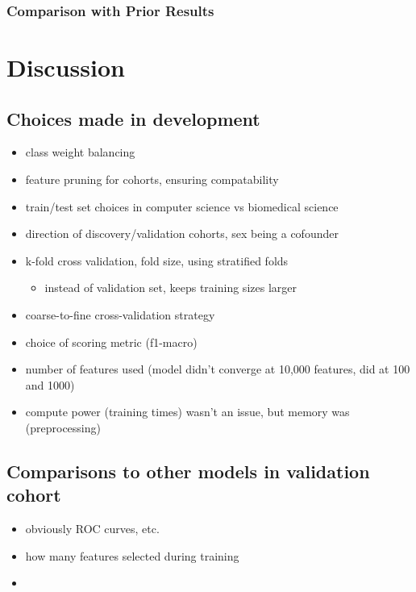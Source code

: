 \documentclass{article}
\begin{document}
\subsubsection{Comparison with Prior Results} \label{sec:model-comparison}


\section{Discussion}

\subsection*{Choices made in development}
\begin{itemize}
    \item class weight balancing
    \item feature pruning for cohorts, ensuring compatability
    \item train/test set choices in computer science vs biomedical science
    \item direction of discovery/validation cohorts, sex being a cofounder
    \item k-fold cross validation, fold size, using stratified folds
    \begin{itemize}
        \item instead of validation set, keeps training sizes larger
    \end{itemize}
    \item coarse-to-fine cross-validation strategy
    \item choice of scoring metric (f1-macro)
    \item number of features used (model didn't converge at 10,000 features, did at 100 and 1000)
    \item compute power (training times) wasn't an issue, but memory was (preprocessing)
\end{itemize}

\subsection*{Comparisons to other models in validation cohort}
\begin{itemize}
    \item obviously ROC curves, etc.
    \item how many features selected during training
    \item
\end{itemize}
\end{document}
